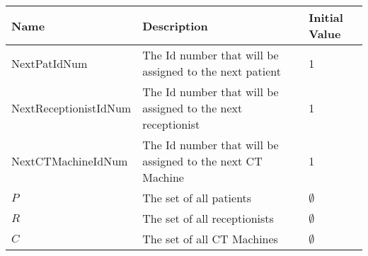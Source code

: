 \begin{tabular}{p{4cm}p{4cm}p{2cm}}
  \toprule
  Name    & Description & Initial Value        \\ \midrule
  NextPatIdNum & The Id number that will be assigned to the next patient & 1 \\
  NextReceptionistIdNum & The Id number that will be assigned to the next receptionist & 1 \\
  NextCTMachineIdNum & The Id number that will be assigned to the next CT Machine & 1 \\ 
  $P$ & The set of all patients & $\emptyset$ \\
  $R$ & The set of all receptionists & $\emptyset$ \\
  $C$ & The set of all CT Machines & $\emptyset$ \\ \bottomrule
\end{tabular}